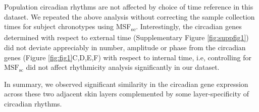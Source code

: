 Population circadian rhythms are not affected by choice of time reference in this dataset. We repeated the above analysis without correcting the sample collection times for subject chronotypes using MSF\textsubscript{sc}. Interestingly, the circadian genes determined with respect to external time (Supplementary Figure \ref{fig:suppfig1}) did not deviate appreciably in number, amplitude or phase from the circadian genes (Figure \ref{fig:fig1}C,D,E,F) with respect to internal time, i.e, controlling for $\textrm{MSF}_\textrm{sc}$ did not affect rhythmicity analysis significantly in our dataset.  

In summary, we observed significant similarity in the circadian gene expression across these two adjacent skin layers complemented by some layer-specificity of circadian rhythms. 



